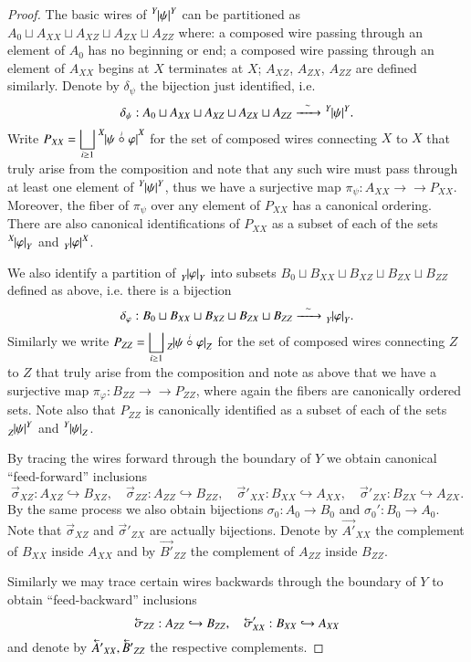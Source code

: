 \documentclass{amsart}
\def\to{\rightarrow}
\newcommand{\into}{\hookrightarrow}
\newcommand{\onto}{\to\!\!\!\!\!\to}
\newcommand{\Too}[1]{\xrightarrow{\ \ #1\ \ }}
\newcommand{\cev}[1]{\reflectbox{\ensuremath{\vec{\reflectbox{\ensuremath{#1}}}}}}
\newcommand{\feeddd}[3]{{\tensor*[^{#2}_{\color{white}{!}}]{{|#1|}}{^{#3}}}}%
\newcommand{\feeddc}[3]{{\tensor*[^{#2}]{{|#1|}}{_{#3}}}}
\newcommand{\feedcd}[3]{{\tensor*[_{#2}]{{|#1|}}{^{#3}}}}
\newcommand{\feedcc}[3]{{\tensor*[^{\color{white}{!}}_{#2}]{{|#1|}}{_{#3}}}}
\theoremstyle{remark}
\theoremstyle{definition}
\begin{document}
\begin{proof}
The basic wires of $\feeddd{\psi}{Y}{Y}$ can be partitioned as $A_0\sqcup A_{XX}\sqcup A_{XZ}\sqcup A_{ZX}\sqcup A_{ZZ}$ where: a composed wire passing through an element of $A_0$ has no beginning or end; a composed wire passing through an element of $A_{XX}$ begins at $X$ terminates at $X$; $A_{XZ}$, $A_{ZX}$, $A_{ZZ}$ are defined similarly.  Denote by $\delta_\psi$ the bijection just identified, i.e.
\[\delta_\psi:A_0\sqcup A_{XX}\sqcup A_{XZ}\sqcup A_{ZX}\sqcup A_{ZZ}\Too{\sim}\feeddd{\psi}{Y}{Y}.\]
Write $P_{XX}=\displaystyle\bigsqcup_{i\ge1}\feeddd{\psi\;\accentset{i}{\circ}\;\varphi}{X}{X}$ for the set of composed wires connecting $X$ to $X$ that truly arise from the composition and note that any such wire must pass through at least one element of $\feeddd{\psi}{Y}{Y}$, thus we have a surjective map $\pi_\psi:A_{XX}\onto P_{XX}$.  Moreover, the fiber of $\pi_\psi$ over any element of $P_{XX}$ has a canonical ordering.  There are also canonical identifications of $P_{XX}$ as a subset of each of the sets $\feeddc{\varphi}{X}{Y}$ and $\feedcd{\varphi}{Y}{X}$.

We also identify a partition of $\feedcc{\varphi}{Y}{Y}$ into subsets $B_0\sqcup B_{XX}\sqcup B_{XZ}\sqcup B_{ZX}\sqcup B_{ZZ}$ defined as above, i.e. there is a bijection
\[\delta_\varphi:B_0\sqcup B_{XX}\sqcup B_{XZ}\sqcup B_{ZX}\sqcup B_{ZZ}\Too{\sim}\feedcc{\varphi}{Y}{Y}.\]
Similarly we write $P_{ZZ}=\displaystyle\bigsqcup_{i\ge1}\feedcc{\psi\;\accentset{i}{\circ}\;\varphi}{Z}{Z}$ for the set of composed wires connecting $Z$ to $Z$ that truly arise from the composition and note as above that we have a surjective map $\pi_\varphi:B_{ZZ}\onto P_{ZZ}$, where again the fibers are canonically ordered sets.  Note also that $P_{ZZ}$ is canonically identified as a subset of each of the sets $\feedcd{\psi}{Z}{Y}$ and $\feeddc{\psi}{Y}{Z}$. 

By tracing the wires forward through the boundary of $Y$ we obtain canonical ``feed-forward'' inclusions
\[\vec{\sigma}_{XZ}:A_{XZ}\into B_{XZ},\quad \vec{\sigma}_{ZZ}:A_{ZZ}\into B_{ZZ},\quad \vec{\sigma}'_{XX}:B_{XX}\into A_{XX},\quad \vec{\sigma}'_{ZX}:B_{ZX}\into A_{ZX}.\]
By the same process we also obtain bijections $\sigma_0:A_0\to B_0$ and $\sigma_0':B_0\to A_0$.  Note that $\vec{\sigma}_{XZ}$ and $\vec{\sigma}'_{ZX}$ are actually bijections.  Denote by $\vec{A'}_{XX}$ the complement of $B_{XX}$ inside $A_{XX}$ and by $\vec{B'}_{ZZ}$ the complement of $A_{ZZ}$ inside $B_{ZZ}$.  

Similarly we may trace certain wires backwards through the boundary of $Y$ to obtain ``feed-backward'' inclusions
\[\cev{\sigma}_{ZZ}:A_{ZZ}\into B_{ZZ},\quad \cev{\sigma}'_{XX}:B_{XX}\into A_{XX}\]
and denote by $\cev{A'}_{XX},\cev{B'}_{ZZ}$ the respective complements.


\end{proof}
\end{document}

